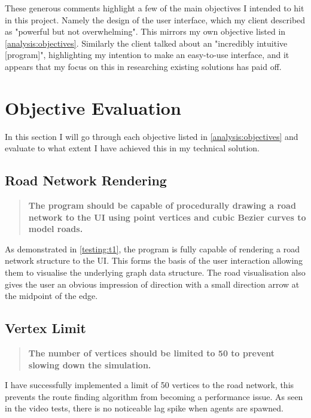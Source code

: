     These generous comments highlight a few of the main objectives I intended to hit in this project. Namely the design of the user interface, which my client described as "powerful but not overwhelming". This mirrors my own objective listed in \autoref{analysis:objectives}. Similarly the client talked about an "incredibly intuitive [program]", highlighting my intention to make an easy-to-use interface, and it appears that my focus on this in researching existing solutions has paid off.

\section{Objective Evaluation}

    In this section I will go through each objective listed in \autoref{analysis:objectives} and evaluate to what extent I have achieved this in my technical solution.

    \subsection{Road Network Rendering}

        \begin{quote}
            \textbf{The program should be capable of procedurally drawing a road network to the UI using point vertices and cubic Bezier curves to model roads.}
        \end{quote}

        As demonstrated in \autoref{testing:t1}, the program is fully capable of rendering a road network structure to the UI. This forms the basis of the user interaction allowing them to visualise the underlying graph data structure. The road visualisation also gives the user an obvious impression of direction with a small direction arrow at the midpoint of the edge.

    \subsection{Vertex Limit}

        \begin{quote}
            \textbf{The number of vertices should be limited to 50 to prevent slowing down the simulation.}
        \end{quote}

        I have successfully implemented a limit of 50 vertices to the road network, this prevents the route finding algorithm from becoming a performance issue. As seen in the video tests, there is no noticeable lag spike when agents are spawned.

